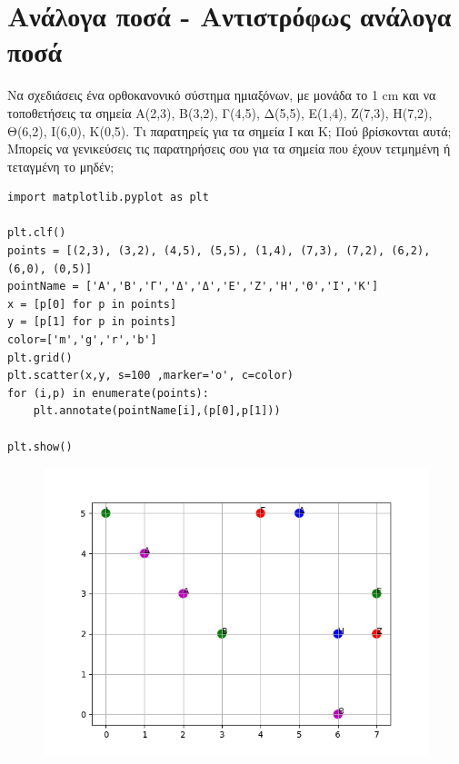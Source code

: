 \chapter{Ανάλογα ποσά - Αντιστρόφως ανάλογα ποσά}
\begin{exercise}
Να σχεδιάσεις ένα ορθοκανονικό σύστημα ημιαξόνων, με μονάδα το 1 cm και να
τοποθετήσεις τα σημεία Α(2,3), Β(3,2), Γ(4,5), Δ(5,5), Ε(1,4), Z(7,3), Η(7,2), Θ(6,2),
Ι(6,0), Κ(0,5). Τι παρατηρείς για τα σημεία Ι και Κ; Πού βρίσκονται αυτά; Μπορείς να
γενικεύσεις τις παρατηρήσεις σου για τα σημεία που έχουν τετμημένη ή τεταγμένη το
μηδέν;
\end{exercise}
\begin{lstlisting}
import matplotlib.pyplot as plt

plt.clf()
points = [(2,3), (3,2), (4,5), (5,5), (1,4), (7,3), (7,2), (6,2), (6,0), (0,5)]
pointName = ['Α','Β','Γ','Δ','Δ','Ε','Ζ','Η','Θ','Ι','Κ']
x = [p[0] for p in points]
y = [p[1] for p in points]
color=['m','g','r','b']
plt.grid()
plt.scatter(x,y, s=100 ,marker='o', c=color)
for (i,p) in enumerate(points):
    plt.annotate(pointName[i],(p[0],p[1]))

plt.show()
\end{lstlisting}
\begin{figure}
\includegraphics{graph1.png}
\end{figure}
